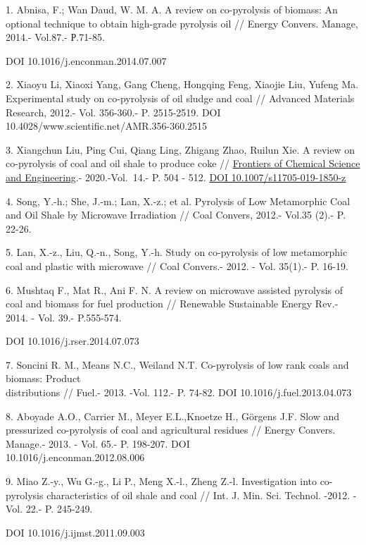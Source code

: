 \begin{references}
1. Abnisa, F.; Wan Daud, W. M. A. A review on co-pyrolysis of biomass:
An optional technique to obtain high-grade pyrolysis oil // Energy
Convers. Manage, 2014.- Vol.87.- Р.71-85.

DOI 10.1016/j.enconman.2014.07.007

2. Xiaoyu Li, Xiaoxi Yang, Gang Cheng, Hongqing Feng, Xiaojie Liu,
Yufeng Ma. Experimental study on co-pyrolysis of oil sludge and coal //
Advanced Materials Research, 2012.- Vol. 356-360.- P. 2515-2519. DOI
10.4028/www.scientific.net/AMR.356-360.2515

3. Xiangchun Liu, Ping Cui, Qiang Ling, Zhigang Zhao, Ruilun Xie. A
review on co-pyrolysis of coal and oil shale to produce coke //
\href{https://link.springer.com/journal/11705}{Frontiers of Chemical
Science and Engineering}.- 2020.-Vol.~14.- P. 504 - 512.
\href{https://doi.org/10.1007/s11705-019-1850-z}{DOI
10.1007/s11705-019-1850-z}

4. Song, Y.-h.; She, J.-m.; Lan, X.-z.; et al. Pyrolysis of Low
Metamorphic Coal and Oil Shale by Microwave Irradiation // Coal Convers,
2012.- Vol.35 (2).- P. 22-26.

5. Lan, X.-z., Liu, Q.-n., Song, Y.-h. Study on co-pyrolysis of low
metamorphic coal and plastic with microwave // Coal Convers.- 2012. -
Vol. 35(1).- P. 16-19.

6. Mushtaq F., Mat R., Ani F. N. A review on microwave assisted
pyrolysis of coal and biomass for fuel production // Renewable
Sustainable Energy Rev.- 2014. - Vol. 39.- P.555-574.

DOI 10.1016/j.rser.2014.07.073

7. Soncini R. M., Means N.C., Weiland N.T. Co-pyrolysis of low rank
coals and biomass: Product \\distributions // Fuel.- 2013. -Vol. 112.- P.
74-82. DOI 10.1016/j.fuel.2013.04.073

8. Aboyade A.O., Carrier M., Meyer E.L.,Knoetze H., Görgens J.F. Slow
and pressurized co-pyrolysis of coal and agricultural residues // Energy
Convers. Manage.- 2013. - Vol. 65.- P. 198-207. DOI
\\10.1016/j.enconman.2012.08.006

9. Miao Z.-y., Wu G.-g., Li P., Meng X.-l., Zheng Z.-l. Investigation
into co-pyrolysis characteristics of oil shale and coal // Int. J. Min.
Sci. Technol. -2012. - Vol. 22.- P. 245-249.

DOI 10.1016/j.ijmst.2011.09.003


\end{references}
